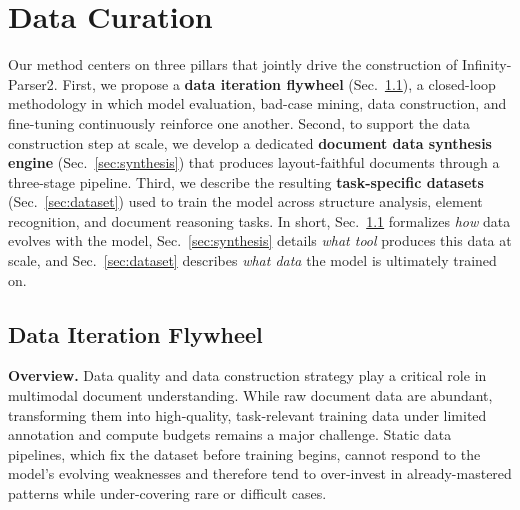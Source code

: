 \section{Data Curation}


Our method centers on three pillars that jointly drive the construction of Infinity-Parser2. First, we propose a \textbf{data iteration flywheel} (Sec.~\ref{sec:flywheel}), a closed-loop methodology in which model evaluation, bad-case mining, data construction, and fine-tuning continuously reinforce one another. Second, to support the data construction step at scale, we develop a dedicated \textbf{document data synthesis engine} (Sec.~\ref{sec:synthesis}) that produces layout-faithful documents through a three-stage pipeline. Third, we describe the resulting \textbf{task-specific datasets} (Sec.~\ref{sec:dataset}) used to train the model across structure analysis, element recognition, and document reasoning tasks. In short, Sec.~\ref{sec:flywheel} formalizes \emph{how} data evolves with the model, Sec.~\ref{sec:synthesis} details \emph{what tool} produces this data at scale, and Sec.~\ref{sec:dataset} describes \emph{what data} the model is ultimately trained on.

\subsection{Data Iteration Flywheel}
\label{sec:flywheel}

\textbf{Overview.} Data quality and data construction strategy play a critical role in multimodal document understanding. While raw document data are abundant, transforming them into high-quality, task-relevant training data under limited annotation and compute budgets remains a major challenge. Static data pipelines, which fix the dataset before training begins, cannot respond to the model's evolving weaknesses and therefore tend to over-invest in already-mastered patterns while under-covering rare or difficult cases.

